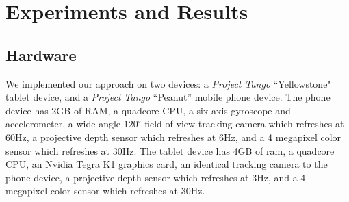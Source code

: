 \documentclass[10pt,twocolumn,letterpaper]{article}
\begin{document}
\section{Experiments and Results}
\label{section:experiments}
\subsection{Hardware}
\label{section:hardware}
We implemented our approach on two devices: a \textit{Project Tango}
``Yellowstone" tablet device, and a \textit{Project Tango} ``Peanut'' mobile 
phone device. The phone device has 2GB of RAM, a quadcore
CPU, a six-axis gyroscope and accelerometer, a wide-angle $120^\circ$ field of
view tracking camera which refreshes at 60Hz, a projective depth sensor which
refreshes at 6Hz, and a 4 megapixel color sensor which refreshes at 30Hz. The
tablet device has 4GB of ram, a quadcore CPU, an Nvidia Tegra K1 graphics card,
an identical tracking camera to the phone device, a projective depth sensor
which refreshes at 3Hz, and a 4 megapixel color sensor which refreshes at 30Hz.
\end{document}
